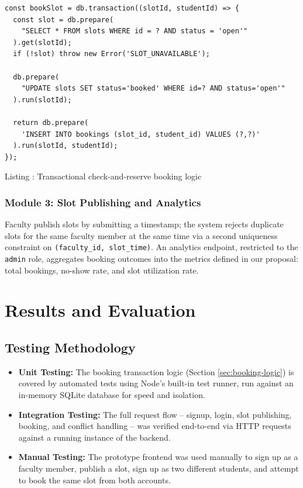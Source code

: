 \documentclass{tietreport}
\begin{document}
\begin{verbatim}
const bookSlot = db.transaction((slotId, studentId) => {
  const slot = db.prepare(
    "SELECT * FROM slots WHERE id = ? AND status = 'open'"
  ).get(slotId);
  if (!slot) throw new Error('SLOT_UNAVAILABLE');

  db.prepare(
    "UPDATE slots SET status='booked' WHERE id=? AND status='open'"
  ).run(slotId);

  return db.prepare(
    'INSERT INTO bookings (slot_id, student_id) VALUES (?,?)'
  ).run(slotId, studentId);
});
\end{verbatim}
\begin{center}
\small Listing \thefigure: Transactional check-and-reserve booking logic \label{lst:booking}
\end{center}

\subsection{Module 3: Slot Publishing and Analytics}

Faculty publish slots by submitting a timestamp; the
system rejects duplicate slots for the same faculty member
at the same time via a second uniqueness constraint on
\texttt{(faculty\_id, slot\_time)}. An analytics endpoint,
restricted to the \texttt{admin} role, aggregates booking
outcomes into the metrics defined in our proposal: total
bookings, no-show rate, and slot utilization rate.


\chapter{Results and Evaluation}

\section{Testing Methodology}

\begin{itemize}
  \item \textbf{Unit Testing:} The booking transaction
    logic (Section \ref{sec:booking-logic}) is covered by
    automated tests using Node's built-in test runner,
    run against an in-memory SQLite database for speed and
    isolation.
  \item \textbf{Integration Testing:} The full request
    flow -- signup, login, slot publishing, booking, and
    conflict handling -- was verified end-to-end via HTTP
    requests against a running instance of the backend.
  \item \textbf{Manual Testing:} The prototype frontend was
    used manually to sign up as a faculty member, publish
    a slot, sign up as two different students, and attempt
    to book the same slot from both accounts.
\end{itemize}
\end{document}
